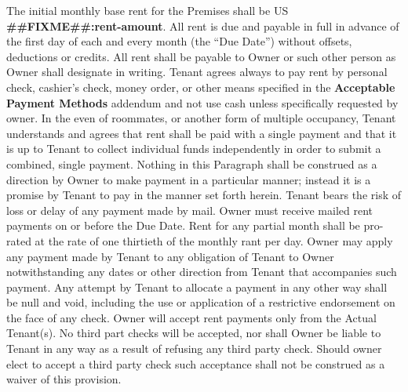 \documentclass[8pt, letterpaper, oneside]{extarticle}
\newcounter{para}
\newcommand\numparagraph{\par\refstepcounter{para}\textbf{\thepara}\hspace{5mm}}
\begin{document}
 \numparagraph{\textbf{RENT:}\hspace{2mm}} The initial monthly base rent for the Premises shall be US \textbf{##FIXME##:rent-amount}. All rent is due and payable in full in advance of the first day of each and every month (the ``Due Date'') without offsets, deductions or credits. All rent shall be payable to Owner or such other person as Owner shall designate in writing. Tenant agrees always to pay rent by personal check, cashier's check, money order, or other means specified in the \textbf{Acceptable Payment Methods} addendum and not use cash unless specifically requested by owner. In the even of roommates, or another form of multiple occupancy, Tenant understands and agrees that rent shall be paid with a single payment and that it is up to Tenant to collect individual funds independently in order to submit a combined, single payment. Nothing in this Paragraph shall be construed as a direction by Owner to make payment in a particular manner; instead it is a promise by Tenant to pay in the manner set forth herein. Tenant bears the risk of loss or delay of any payment made by mail. Owner must receive mailed rent payments on or before the Due Date. Rent for any partial month shall be pro-rated at the rate of one thirtieth of the monthly rant per day. Owner may apply any payment made by Tenant to any obligation of Tenant to Owner notwithstanding any dates or other direction from Tenant that accompanies such payment. Any attempt by Tenant to allocate a payment in any other way shall be null and void, including the use or application of a restrictive endorsement on the face of any check. Owner will accept rent payments only from the Actual Tenant(s). No third part checks will be accepted, nor shall Owner be liable to Tenant in any way as a result of refusing any third party check. Should owner elect to accept a third party check such acceptance shall not be construed as a waiver of this provision.
\end{document}
